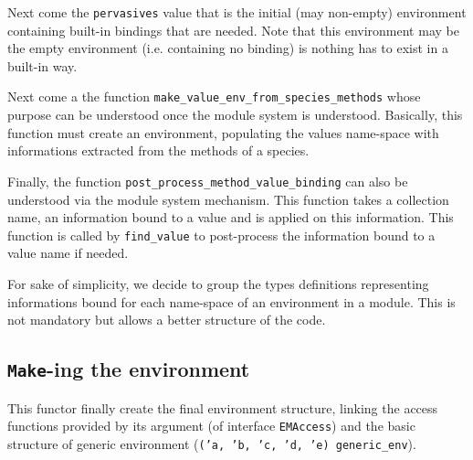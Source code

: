 \medskip
Next come the {\tt pervasives} value that is the initial (may
non-empty) environment containing built-in bindings that are
needed. Note that this environment may be the empty environment
(i.e. containing no binding) is nothing has to exist in a built-in
way.

\medskip
Next come a the function {\tt make\_value\_env\_from\_species\_methods}
whose purpose can be understood once the module system is
understood. Basically, this function must create an environment,
populating the values name-space with informations extracted from the
methods of a species.

\medskip
Finally, the function {\tt post\_process\_method\_value\_binding} can
also be understood via the module system mechanism. This function takes
a collection name, an information bound to a value and is applied on
this information. This function is called by {\tt find\_value} to
post-process the information bound to a value name if needed.

\medskip
For sake of simplicity, we decide to group the types definitions
representing informations bound for each name-space of an environment
in a module. This is not mandatory but allows a better structure of
the code.


\subsection{{\tt Make}-ing the environment}
This functor finally create the final environment structure, linking
the access functions provided by its argument (of interface
{\tt EMAccess}) and the basic structure of generic environment
({\tt ('a, 'b, 'c, 'd, 'e) generic\_env}).

